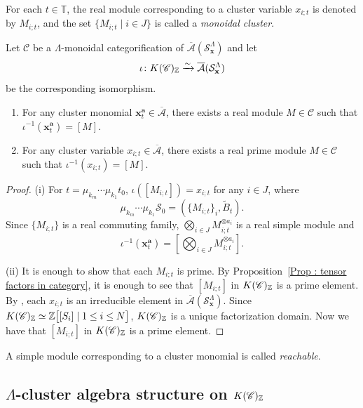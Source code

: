 For each $t \in \mathbb{T}$, the real module corresponding to a cluster variable $x_{i;t}$ is denoted by 
$M_{i;t}$, and the set  $\{M_{i;t} \mid i \in J\}$ is called a \emph{monoidal cluster}. 

\begin{Prop}
\label{Prop : cluster monomials and real prime modules}
Let $\mathscr{C}$ be a $\Lambda$-monoidal categorification of
$\overline{\mathcal{A}}(\mathcal{S}_{\mathbf{x}}^{\Lambda})$
and let
\[
\iota \colon K(\mathscr{C})_{\mathbb{Z}}
\xrightarrow{\sim}
\overline{\mathcal{A}}(\mathcal{S}_{\mathbf{x}}^{\Lambda})
\]
be the corresponding isomorphism.
\begin{enumerate}
    \item[(i)] For any cluster monomial
    $\mathbf{x}_t^{\mathbf{a}} \in \overline{\mathcal{A}}$,
    there exists a real module $M \in \mathscr{C}$
    such that $\iota^{-1}(\mathbf{x}_t^{\mathbf{a}}) = [M]$.
    \item[(ii)] For any cluster variable
    $x_{i;t} \in \overline{\mathcal{A}}$,
    there exists a real prime module $M \in \mathscr{C}$
    such that $\iota^{-1}(x_{i;t}) = [M]$.
\end{enumerate}
\end{Prop}

\begin{proof}
(i) For $t = \mu_{k_m}\cdots\mu_{k_1}t_0$,
$\iota([M_{i;t}]) = x_{i;t}$ for any $i \in J$, where
\[
\mu_{k_m}\cdots\mu_{k_1}\mathscr{S}_0
= (\{M_{i;t}\}_i, \widetilde{B}_t).
\]
Since $\{M_{i;t}\}$ is a real commuting family,
$\bigotimes_{i \in J}M_{i;t}^{\otimes a_i}$
is a real simple module and
\[
\iota^{-1}(\mathbf{x}_t^{\mathbf{a}})
= \left[\bigotimes_{i \in J}M_{i;t}^{\otimes a_i}\right].
\]

(ii) It is enough to show that each $M_{i;t}$ is prime.
By Proposition~\ref{Prop : tensor factors in category},
it is enough to see that $[M_{i;t}]$ in $K(\mathscr{C})_{\mathbb{Z}}$
is a prime element.
By \cite{GLSclu}, each $x_{i;t}$ is an irreducible element
in $\overline{\mathcal{A}}(\mathcal{S}_{\mathbf{x}}^{\Lambda})$.
Since
$K(\mathscr{C})_{\mathbb{Z}}
\simeq \mathbb{Z}\bigl[[S_i] \mid 1 \leq i \leq N\bigr]$,
$K(\mathscr{C})_{\mathbb{Z}}$ is a unique factorization domain.
Now we have that $[M_{i;t}]$ in $K(\mathscr{C})_{\mathbb{Z}}$
is a prime element.
\end{proof}

A simple module corresponding to a cluster monomial is called \emph{reachable}. 

\subsection{$\Lambda$-cluster algebra structure on $K(\mathscr{C})_{\mathbb{Z}}$}
\label{ssec : Lambda cluster algebra structure}

